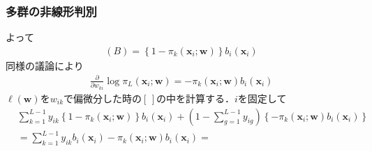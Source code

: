 \documentclass[dvipdfmx,cjk]{beamer}
\theoremstyle{example}
\begin{document}
\begin{frame}
    \frametitle{多群の非線形判別}
    よって
    \begin{align*}
        (B)=\left\{1-\pi_k(\boldsymbol{x}_i;\boldsymbol{w})\right\}b_i(\boldsymbol{x}_i)
    \end{align*}
    同様の議論により
    \begin{align*}
        \frac{\partial}{\partial w_{ki}}\log \pi_L(\boldsymbol{x}_i;\boldsymbol{w})=-\pi_k(\boldsymbol{x}_i;\boldsymbol{w})b_i(\boldsymbol{x}_i)
    \end{align*}
    $\ell(\boldsymbol{w})$を$w_{ik}$で偏微分した時の$\left[\,\right]$の中を計算する．$i$を固定して
    \begin{align*}
         & \sum_{k=1}^{L-1}y_{ik}\left\{1-\pi_k(\boldsymbol{x}_i;\boldsymbol{w})\right\}b_i(\boldsymbol{x}_i)+(1-\sum_{g=1}^{L-1}y_{ig})\left\{-\pi_k(\boldsymbol{x}_i;\boldsymbol{w})b_i(\boldsymbol{x}_i)\right\} \\
         & =\sum_{k=1}^{L-1}y_{ik}b_i(\boldsymbol{x}_i)-\pi_k(\boldsymbol{x}_i;\boldsymbol{w})b_i(\boldsymbol{x}_i)=
    \end{align*}
\end{frame}
\end{document}
